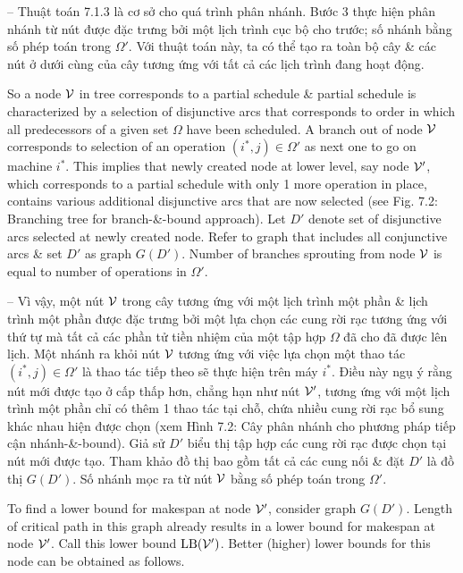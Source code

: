 \documentclass{article}
\begin{document}
\begin{itemize}
\begin{itemize}
        -- Thuật toán 7.1.3 là cơ sở cho quá trình phân nhánh. Bước 3 thực hiện phân nhánh từ nút được đặc trưng bởi một lịch trình cục bộ cho trước; số nhánh bằng số phép toán trong $\Omega'$. Với thuật toán này, ta có thể tạo ra toàn bộ cây \& các nút ở dưới cùng của cây tương ứng với tất cả các lịch trình đang hoạt động.

        So a node ${\cal V}$ in tree corresponds to a partial schedule \& partial schedule is characterized by a selection of disjunctive arcs that corresponds to order in which all predecessors of a given set $\Omega$ have been scheduled. A branch out of node ${\cal V}$ corresponds to selection of an operation $(i^*,j)\in\Omega'$ as next one to go on machine $i^*$. This implies that newly created node at lower level, say node ${\cal V}'$, which corresponds to a partial schedule with only 1 more operation in place, contains various additional disjunctive arcs that are now selected (see {\sf Fig. 7.2: Branching tree for branch-\&-bound approach}). Let $D'$ denote set of disjunctive arcs selected at newly created node. Refer to graph that includes all conjunctive arcs \& set $D'$ as graph $G(D')$. Number of branches sprouting from node ${\cal V}$ is equal to number of operations in $\Omega'$.

        -- Vì vậy, một nút ${\cal V}$ trong cây tương ứng với một lịch trình một phần \& lịch trình một phần được đặc trưng bởi một lựa chọn các cung rời rạc tương ứng với thứ tự mà tất cả các phần tử tiền nhiệm của một tập hợp $\Omega$ đã cho đã được lên lịch. Một nhánh ra khỏi nút ${\cal V}$ tương ứng với việc lựa chọn một thao tác $(i^*,j)\in\Omega'$ là thao tác tiếp theo sẽ thực hiện trên máy $i^*$. Điều này ngụ ý rằng nút mới được tạo ở cấp thấp hơn, chẳng hạn như nút ${\cal V}'$, tương ứng với một lịch trình một phần chỉ có thêm 1 thao tác tại chỗ, chứa nhiều cung rời rạc bổ sung khác nhau hiện được chọn (xem {\sf Hình 7.2: Cây phân nhánh cho phương pháp tiếp cận nhánh-\&-bound}). Giả sử $D'$ biểu thị tập hợp các cung rời rạc được chọn tại nút mới được tạo. Tham khảo đồ thị bao gồm tất cả các cung nối \& đặt $D'$ là đồ thị $G(D')$. Số nhánh mọc ra từ nút ${\cal V}$ bằng số phép toán trong $\Omega'$.

        To find a lower bound for makespan at node ${\cal V}'$, consider graph $G(D')$. Length of critical path in this graph already results in a lower bound for makespan at node ${\cal V}'$. Call this lower bound ${\rm LB}({\cal V}')$. Better (higher) lower bounds for this node can be obtained as follows.


\end{itemize}
\end{itemize}
\end{document}
